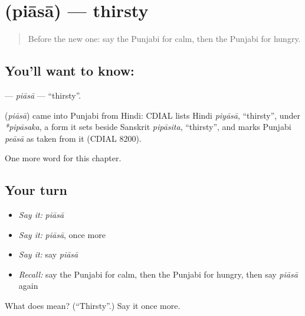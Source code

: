\section[\texorpdfstring{\pa{ਪਿਆਸਾ} (piāsā)}{ਪਿਆਸਾ (piāsā)}]{ (piāsā) — thirsty}

\label{lesson:PA-C145-piasa}



\begin{quote}
Before the new one: say the Punjabi for calm, then the Punjabi for hungry.
\end{quote}

\subsection*{You'll want to know: }
\textbf{} — \emph{piāsā} — \textquotedblleft{}thirsty\textquotedblright{}.

\begin{cousinweb}
\textbf{} (\emph{piāsā}) came into Punjabi from Hindi: CDIAL lists Hindi \emph{piyāsā}, \textquotedblleft{}thirsty\textquotedblright{}, under \emph{*pipāsaka}, a form it sets beside Sanskrit \emph{pipāsita}, \textquotedblleft{}thirsty\textquotedblright{}, and marks Punjabi \emph{peāsā} as taken from it (CDIAL 8200).
\end{cousinweb}

\begin{grammarlens}[title={What you've built}]
One more word for this chapter.
\end{grammarlens}

\subsection*{Your turn}
\begin{itemize}
\raggedright
  \item \emph{Say it:} \emph{piāsā}
  \item \emph{Say it:} \emph{piāsā}, once more
  \item \emph{Say it:} say \emph{piāsā}
  \item \emph{Recall:} say the Punjabi for calm, then the Punjabi for hungry, then say \emph{piāsā} again
\end{itemize}

\begin{tcolorbox}[breakable,colback=teal!4,colframe=teal!35!black,title={Before you move on}]
What does  mean? (\textquotedblleft{}Thirsty\textquotedblright{}.) Say it once more.
\end{tcolorbox}
